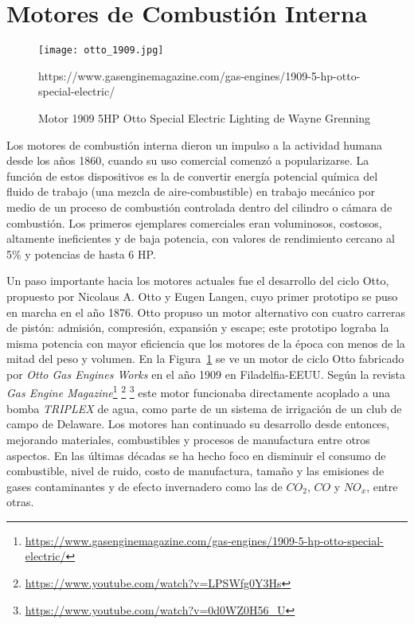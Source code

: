 \section{Motores de Combustión Interna}

\begin{figure} \centering \texttt{[image: otto\_1909.jpg]}
    \caption{Motor 1909 5HP Otto Special Electric Lighting de Wayne
Grenning}\label{fig:otto1909} %
https://www.gasenginemagazine.com/gas-engines/1909-5-hp-otto-special-electric/
\end{figure}

Los motores de combustión interna dieron un impulso a la actividad humana desde
los años 1860, cuando su uso comercial comenzó a popularizarse.
%
La función de estos dispositivos es la de convertir energía potencial química del fluido
de trabajo (una mezcla de aire-combustible) en trabajo mecánico por medio de un
proceso de combustión controlada dentro del cilindro o cámara de combustión.
%
Los primeros ejemplares comerciales eran voluminosos, costosos, altamente
ineficientes y de baja potencia, con valores de rendimiento cercano al 5\% y
potencias de hasta 6 HP.

Un paso importante hacia los motores actuales fue el desarrollo del ciclo Otto,
propuesto por Nicolaus A. Otto y Eugen Langen, cuyo primer prototipo se puso en
marcha en el año 1876.
%
Otto propuso un motor alternativo con cuatro carreras de pistón: admisión,
compresión, expansión y escape; este prototipo lograba la misma potencia con
mayor eficiencia que los motores de la época con menos de la mitad del peso y
volumen.
%
En la Figura~\ref{fig:otto1909} se ve un motor de ciclo Otto fabricado por
\emph{Otto Gas Engines Works} en el año 1909 en Filadelfia-EEUU.
%
Según la revista \emph{Gas Engine
Magazine}\footnote{\url{https://www.gasenginemagazine.com/gas-engines/1909-5-hp-otto-special-electric/}}
\footnote{ \url{https://www.youtube.com/watch?v=LPSWfg0Y3Hs} } \footnote{
\url{https://www.youtube.com/watch?v=0d0WZ0H56_U} } este motor funcionaba
directamente acoplado a una bomba \emph{TRIPLEX} de agua, como parte de un
sistema de irrigación de un club de campo de Delaware.
%
Los motores han continuado su desarrollo desde entonces, mejorando materiales,
combustibles y procesos de manufactura entre otros aspectos.
%
En las últimas décadas se ha hecho foco en disminuir el consumo de combustible,
nivel de ruido, costo de manufactura, tamaño y las emisiones de gases
contaminantes y de efecto invernadero como las de $CO_2$, $CO$ y $NO_x$, entre
otras.


